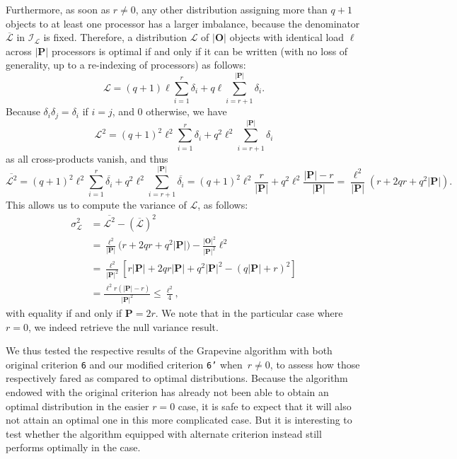 Furthermore, as soon as $r\neq0$, any other distribution assigning
more than $q+1$ objects to at least one processor has
a larger imbalance, because the denominator
$\overline{\mathcal{L}}$ in $\mathcal{I}_{\mathcal{L}}$ is fixed.
Therefore, a distribution $\mathcal{L}$ of
$\vert\mathbf{O}\vert$ objects with identical load $\ell$ across
$\vert\mathbf{P}\vert$ processors is optimal if and only if it can be
written (with no loss of generality, up to a re-indexing of
processors) as follows:
\[
\mathcal{L}=
(q+1)\ell \sum_{i=1}^{r}\delta_i
+ q\ell\!\sum_{i=r+1}^{\vert{\mathbf{P}}\vert}\delta_i.
\]
Because $\delta_i\delta_j=\delta_i$ if $i=j$, and $0$ otherwise, we have
\[
\mathcal{L}^2=
(q+1)^2\ell^2\sum_{i=1}^{r}\delta_i
+ q^2\ell^2\sum_{i=r+1}^{\vert{\mathbf{P}}\vert}\delta_i
\]
as all cross-products vanish, and thus
\[
\overline{\mathcal{L}^2}=
(q+1)^2\ell^2\sum_{i=1}^{r}\overline{\delta_i}
+ q^2\ell^2\sum_{i=r+1}^{\vert{\mathbf{P}}\vert}\overline{\delta_i}
= (q+1)^2\ell^2\frac{r}{\vert{\mathbf{P}}\vert}
+ q^2\ell^2\frac{\vert{\mathbf{P}}\vert-r}{\vert{\mathbf{P}}\vert}
= \frac{\ell^2}{\vert{\mathbf{P}}\vert}
(r + 2qr + q^2\vert{\mathbf{P}}\vert).
\]
This allows us to compute the variance of $\mathcal{L}$, as follows:
\begin{align*}
\sigma_{\mathcal{L}}^2
&= \overline{\mathcal{L}^2} - (\overline{\mathcal{L}})^2\\
&= \frac{\ell^2}{\vert{\mathbf{P}}\vert}
\big(r + 2qr + q^2\vert{\mathbf{P}}\vert\big)
- \frac{\vert\mathbf{O}\vert^2}{\vert\mathbf{P}\vert^2}\ell^2\\
&= \frac{\ell^2}{\vert{\mathbf{P}}\vert^2}
\left[r\vert{\mathbf{P}}\vert + 2qr\vert{\mathbf{P}}\vert
+ q^2\vert{\mathbf{P}}\vert^2 
- (q\vert{\mathbf{P}}\vert+r)^2\right]\\
&= \frac{\ell^2 r(\vert{\mathbf{P}}\vert - r)}
{\vert{\mathbf{P}}\vert^2}
\le \frac{\ell^2}{4},
\end{align*}
with equality if and only if $\mathbf{P}=2r$.
We note that in the particular case where $r=0$, we indeed retrieve
the null variance result.

We thus tested the respective results of the Grapevine algorithm with
both original criterion \texttt{6} and our modified criterion
\texttt{6'} when~$r\neq0$, to assess how those respectively fared as
compared to optimal distributions.
Because the algorithm endowed with the original criterion has already
not been able to obtain an optimal distribution in the easier $r=0$
case, it is safe to expect that it will also not attain an optimal one
in this more complicated case. But it is interesting to test whether
the algorithm equipped with alternate criterion instead still performs
optimally in the case.

